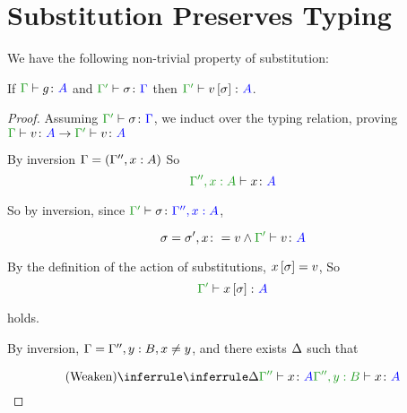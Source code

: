 \documentclass{report}
\begin{document}
   
    

\section{Substitution Preserves Typing}
We have the following non-trivial property of substitution:


\begin{theorem}\label{SubsTyping}

    If $\typerelation{\G}{g}{A}$ and $\typerelation{\G'}{\si}{\G}$ then $\typerelation{\G'}{v\ssi}{A}$.
\end{theorem}



\begin{framed}
    \begin{proof}
        
        Assuming $\typerelation{\G'}{\si}{\G}$, we induct over the typing relation, proving $\gtyperelation{v}{A}\rightarrow\typerelation{\G'}{v}{A}$
        
                By inversion $\Gamma = (\Gamma'', x:A)$
                So \begin{equation}
                    \typerelation{\G'',x:A}{x}{A}
                \end{equation}
        
                So by inversion, since $\typerelation{\G'}{\si}{\G'', x:A}$, 
        
                \begin{equation}
                    \si = \si', x\setto v \wedge \typerelation{\G'}{v}{A}
                \end{equation}
        
                By the definition of the action of substitutions, $x\left[\sigma\right] = v$, So
                \begin{equation}
                    \typerelation{\G'}{x\ssi}{A}
                \end{equation}
        
                holds.
                
                By inversion, $\Gamma = \Gamma'', y: B, x \neq y$, and there exists $\Delta$ such that
        
                \begin{equation}
                    \ntreeruleI{Weaken}{\treeruleI{\D}{\typerelation{\G''}{x}{A}}}{\typerelation{\G'', y: B}{x}{A}}
                \end{equation}
        

\end{proof}
\end{framed}
\end{document}

